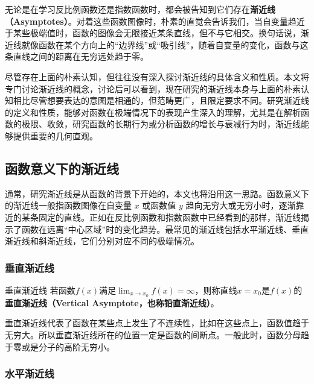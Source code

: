 
\begin{issues}
\issueDraft
\end{issues}

无论是在学习反比例函数还是指数函数时，都会被告知到它们存在\textbf{渐近线（Asymptotes）}。对着这些函数图像时，朴素的直觉会告诉我们，当自变量趋近于某些极端值时，函数的图像会无限接近某条直线，但不与它相交。换句话说，渐近线就像函数在某个方向上的“边界线”或“吸引线”，随着自变量的变化，函数与这条直线之间的距离在无穷远处趋于零。

尽管存在上面的朴素认知，但往往没有深入探讨渐近线的具体含义和性质。本文将专门讨论渐近线的概念，讨论后可以看到，现在研究的渐近线本身与上面的朴素认知相比尽管想要表达的意图是相通的，但范畴更广，且限定要求不同。研究渐近线的定义和性质，能够对函数在极端情况下的表现产生深入的理解，尤其是在解析函数的极限、收敛，研究函数的长期行为或分析函数的增长与衰减行为时，渐近线能够提供重要的几何直观。

\subsection{函数意义下的渐近线}

通常，研究渐近线是从函数的背景下开始的，本文也将沿用这一思路。函数意义下的渐近线一般指函数图像在自变量 $x$ 或函数值 $y$ 趋向无穷大或无穷小时，逐渐靠近的某条固定的直线。正如在反比例函数和指数函数中已经看到的那样，渐近线揭示了函数在远离“中心区域”时的变化趋势。最常见的渐近线包括水平渐近线、垂直渐近线和斜渐近线，它们分别对应不同的极端情况。

\subsubsection{垂直渐近线}

\begin{definition}{垂直渐近线}
若函数$f(x)$满足$\displaystyle \lim_{x\to x_0}f(x)=\infty$，则称直线$x=x_0$是$f(x)$的\textbf{垂直渐近线（Vertical Asymptote，也称铅直渐近线）}。
\end{definition}

垂直渐近线代表了函数在某些点上发生了不连续性，比如在这些点上，函数值趋于无穷大。所以垂直渐近线所在的位置一定是函数的间断点。一般此时，函数分母趋于零或是分子的高阶无穷小。

\subsubsection{水平渐近线}


